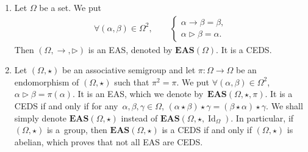 \documentclass[10pt,a4paper]{amsart}
\numberwithin{equation}{section}
\newcommand{\eas}{\mathbf{EAS}}
\begin{document}
\begin{Example}\qquad
\begin{enumerate}\itemsep=0pt
\item[(1)] Let $\Omega$ be a set. We put
\begin{align*}
\forall (\alpha,\beta) \in \Omega^2,\qquad\begin{cases}
 \alpha \rightarrow \beta=\beta,\\
\alpha \triangleright \beta=\alpha.
\end{cases} \end{align*}
Then $(\Omega,\rightarrow,\triangleright)$ is an EAS, denoted by $\eas(\Omega)$. It is a CEDS.

\item[(2)] Let $(\Omega,\star)$ be an associative semigroup and let $\pi\colon\Omega\longrightarrow\Omega$ be an endomorphism of $(\Omega,\star)$ such that $\pi^2=\pi$. We put
$
\forall (\alpha,\beta) \in \Omega^2$, $ \alpha \triangleright \beta=\pi(\alpha)$.
It is an EAS, which we denote by~${\eas(\Omega,\star,\pi)}$. It is a CEDS if and only if for any~${\alpha,\beta,\gamma \in \Omega}$,
$(\alpha \star \beta)\star \gamma=(\beta \star \alpha)\star \gamma$.
We shall simply denote $\eas(\Omega,\star)$ instead of $\eas(\Omega,\star,\operatorname{Id}_\Omega)$. In particular, if $(\Omega,\star)$ is a~group, then $\eas(\Omega,\star)$ is a CEDS if and only if $(\Omega,\star)$ is abelian, which proves that not all EAS are CEDS.


\end{enumerate}
\end{Example}
\end{document}
